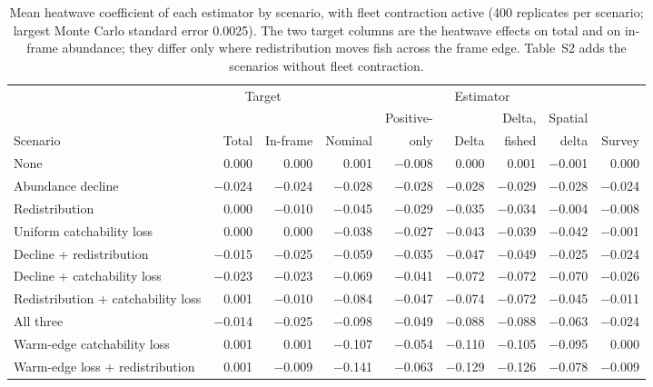 \documentclass[11pt,a4paper]{article}
\begin{document}
\begin{table}[tbp]
\centering\footnotesize
\setlength{\tabcolsep}{3.5pt}
\caption{Mean heatwave coefficient of each estimator by scenario, with fleet contraction active (400 replicates per scenario; largest Monte Carlo standard error 0.0025). The two target columns are the heatwave effects on total and on in-frame abundance; they differ only where redistribution moves fish across the frame edge. Table~S2 adds the scenarios without fleet contraction.}
\label{tab:coef}
\begin{tabular}{@{}>{\raggedright\arraybackslash}p{3.2cm}rrrrrrrr@{}}
\toprule
 & \multicolumn{2}{c}{Target} & \multicolumn{6}{c}{Estimator} \\
\cmidrule(lr){2-3}\cmidrule(l){4-9}
 & & & & Positive- & & Delta, & Spatial & \\
Scenario & Total & In-frame & Nominal & only & Delta & fished & delta & Survey \\
\midrule
None & 0.000 & 0.000 & 0.001 & $-$0.008 & 0.000 & 0.001 & $-$0.001 & 0.000 \\
Abundance decline & $-$0.024 & $-$0.024 & $-$0.028 & $-$0.028 & $-$0.028 & $-$0.029 & $-$0.028 & $-$0.024 \\
Redistribution & 0.000 & $-$0.010 & $-$0.045 & $-$0.029 & $-$0.035 & $-$0.034 & $-$0.004 & $-$0.008 \\
Uniform catchability loss & 0.000 & 0.000 & $-$0.038 & $-$0.027 & $-$0.043 & $-$0.039 & $-$0.042 & $-$0.001 \\
Decline + redistribution & $-$0.015 & $-$0.025 & $-$0.059 & $-$0.035 & $-$0.047 & $-$0.049 & $-$0.025 & $-$0.024 \\
Decline + catchability loss & $-$0.023 & $-$0.023 & $-$0.069 & $-$0.041 & $-$0.072 & $-$0.072 & $-$0.070 & $-$0.026 \\
Redistribution + catchability loss & 0.001 & $-$0.010 & $-$0.084 & $-$0.047 & $-$0.074 & $-$0.072 & $-$0.045 & $-$0.011 \\
All three & $-$0.014 & $-$0.025 & $-$0.098 & $-$0.049 & $-$0.088 & $-$0.088 & $-$0.063 & $-$0.024 \\
Warm-edge catchability loss & 0.001 & 0.001 & $-$0.107 & $-$0.054 & $-$0.110 & $-$0.105 & $-$0.095 & 0.000 \\
Warm-edge loss + redistribution & 0.001 & $-$0.009 & $-$0.141 & $-$0.063 & $-$0.129 & $-$0.126 & $-$0.078 & $-$0.009 \\
\bottomrule
\end{tabular}
\end{table}
\end{document}

